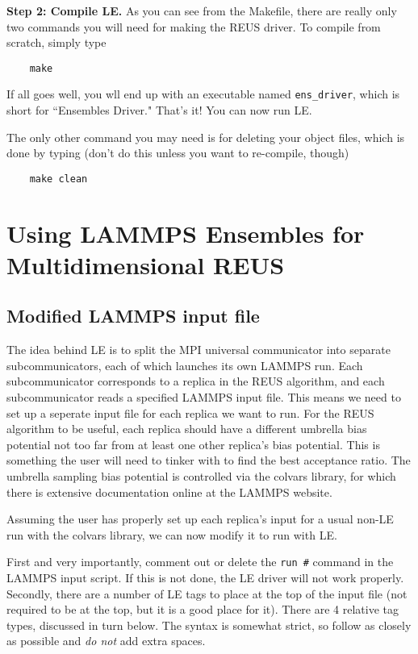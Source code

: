 \documentclass[10pt]{article}
\begin{document}
\textbf{Step 2: Compile LE.} As you can see from the Makefile, there are really
only two commands you will need for making the REUS driver. To compile from scratch, simply type
\begin{verbatim}
	make
\end{verbatim}
If all goes well, you wll end up with an executable named \texttt{ens\_driver}, which is
short for ``Ensembles Driver." That's it! You can now run LE.

The only other command you may need is for deleting your object
files, which is done by typing (don't do this unless you want to re-compile, though)
\begin{verbatim}
	make clean
\end{verbatim}

\section{Using LAMMPS Ensembles for Multidimensional REUS}
\subsection{Modified LAMMPS input file}
The idea behind LE is to split the MPI universal communicator 
into separate subcommunicators,
each of which launches its own LAMMPS run. Each subcommunicator corresponds to a
replica in the REUS algorithm, and each subcommunicator reads a specified LAMMPS input file.
This means we need to set up a seperate input file for each replica we want to run. For the REUS
algorithm to be useful, each replica should have a different umbrella bias potential not
too far from at least one other replica's bias potential. This is something the user will need
to tinker with to find the best acceptance ratio.
The umbrella sampling bias potential is controlled via the colvars library, for which
there is extensive documentation online at the LAMMPS website.

Assuming the user has properly set up each replica's input for a usual non-LE run
with the colvars library, we can now modify it to run with LE. 

First and very importantly, comment out
or delete the \texttt{run \#} command in the LAMMPS input script. If this is not done,
the LE driver will not work properly. Secondly, there are a number of LE tags to place
at the top of the input file (not required to be at the top, but it is a good place for it). 
There are 4 relative tag types, discussed in turn below. The syntax is somewhat strict,
so follow as closely as possible and {\em do not} add extra spaces.
\end{document}
